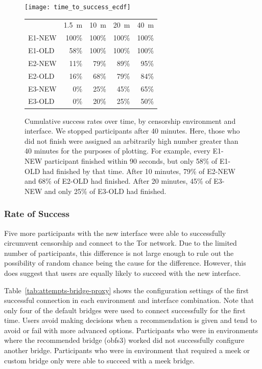 \documentclass[USenglish,oneside,twocolumn]{article}
\begin{document}
\begin{figure}
\centering
\texttt{[image: time\_to\_success\_ecdf]}
	\begin{tabular}{l r r r r}
	& \multicolumn{1}{c}{1.5~m} & \multicolumn{1}{c}{10~m} & \multicolumn{1}{c}{20~m} & \multicolumn{1}{c}{40~m} \\
	\noalign{\hrule}
	E1-NEW & 100\% & 100\% & 100\% & 100\% \\
	E1-OLD & 58\% & 100\% & 100\% & 100\% \\
	E2-NEW & 11\% & 79\% & 89\% & 95\% \\
	E2-OLD & 16\% & 68\% & 79\% & 84\% \\
	E3-NEW & 0\% & 25\% & 45\% & 65\% \\
	E3-OLD & 0\% & 20\% & 25\% & 50\% \\
	\end{tabular}
\caption{
Cumulative success rates over time, by censorship environment and interface.
We stopped participants after 40 minutes. Here, those who did not finish were assigned
an arbitrarily high number greater than 40 minutes for the purposes of plotting. 
For example, every E1-NEW participant finished within 90 seconds,
but only 58\% of E1-OLD had finished by that time.
After 10 minutes, 79\% of E2-NEW and 68\% of E2-OLD had finished.
After 20 minutes, 45\% of E3-NEW and only 25\% of E3-OLD had finished.
}
\label{fig:time_to_success_ecdf}
\end{figure}

\subsubsection{Rate of Success} 
Five more participants with the new interface were able to successfully circumvent censorship and connect to the Tor network. Due to the limited number of participants, this difference is not large enough to rule out the possibility of random chance being the cause for the difference. However, this does suggest that users are equally likely to succeed with the new interface. 

Table~\ref{tab:attempts-bridge-proxy} shows the configuration settings of the first successful connection in each environment and interface combination. Note that only four of the default bridges were used to connect successfully for the first time. Users avoid making decisions when a recommendation is given and tend to avoid or fail with more advanced options. Participants who were in environments where the recommended bridge (obfs3) worked did not successfully configure another bridge. Participants who were in environment that required a meek or custom bridge only were able to succeed with a meek bridge.
\end{document}
